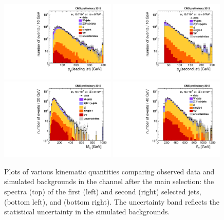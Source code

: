 \begin{figure}[hbtp]
  \begin{center}
    \includegraphics[width=0.49\textwidth]{figures/etau/jet1PtBTag.pdf}
    \includegraphics[width=0.49\textwidth]{figures/etau/jet2PtBTag.pdf} \\
    \includegraphics[width=0.49\textwidth]{figures/etau/finalMass.pdf}
    \includegraphics[width=0.49\textwidth]{figures/etau/STbjetBTag.pdf}
    \caption{Plots of various kinematic quantities comparing observed data and simulated backgrounds in the \etau channel after the main selection: the \pt spectra (top) of the first (left) and second (right) selected jets, \MassTJ (bottom left), and \ST (bottom right). The uncertainty band reflects the statistical uncertainty in the simulated backgrounds.}
    \label{fig:mainseletau}
  \end{center}
\end{figure}

